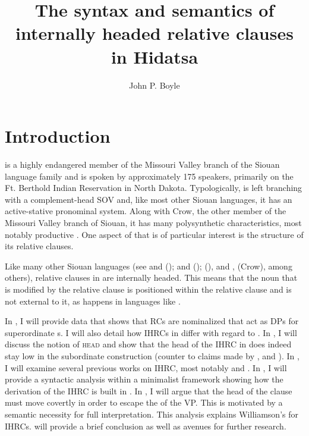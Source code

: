 \documentclass[output=paper]{LSP/langsci}
\author{John P. Boyle}
\title{The syntax and semantics of internally headed relative clauses in {Hidatsa}}
\begin{document}
\section{Introduction}  
\largerpage[-2]
 is a highly endangered member of the Missouri Valley branch of the Siouan language family and is spoken by approximately 175 speakers, primarily on the Ft. Berthold Indian Reservation in North Dakota. Typologically,  is left branching with a complement-head SOV  and, like most other Siouan languages, it has an active-stative pronominal system. Along with Crow, the other member of the Missouri Valley branch of Siouan, it has many polysynthetic characteristics, most notably productive  \citep{Rankinetal2003, Boyle2007}. One aspect of  that is of particular interest is the structure of its relative clauses.
	
Like many other Siouan languages (see \citealt{Drummond1976} and \citealt{Cumberland2005} (); \citealt{Williamson1987} and \citealt{RoodTaylor1996} (); \citealt{Quintero2004} (), and \citealt{Graczyk1991b}, \citeyear{Graczyk2007} (Crow), among others), relative clauses in  are internally headed. This means that the noun that is modified by the relative clause is positioned within the relative clause and is not external to it, as happens in languages like .
	
In , I will provide data that shows that  RCs are nominalized  that act as DPs for superordinate s. I will also detail how IHRCs in  differ with regard to . In , I will discuss the notion of \textsc{head} and show that the head of the IHRC in  does indeed stay low in the subordinate construction (counter to claims made by \citet{Kayne1994}, \citet{Bianchi1999} and \citet{DiSciullo2005}). In , I will examine several previous works on IHRC, most notably \citet{Williamson1987} and \citet{Culy1990}. In , I will provide a syntactic analysis within a minimalist framework showing how the derivation of the IHRC is built in . In , I will argue that the head of the clause must move covertly in order to escape the  of the VP. This is motivated by a semantic necessity for full interpretation. This analysis explains Williamson's  for IHRCs.  will provide a brief conclusion as well as avenues for further research.
\end{document}
